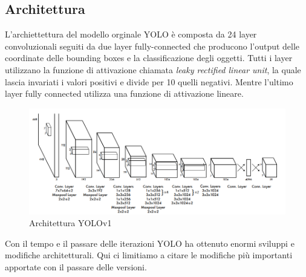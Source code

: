 \documentclass[12pt,a4paper,openright,twoside]{report}
\begin{document}
\subsection{Architettura}
L'archiettettura del modello orginale YOLO è composta da 24 layer convoluzionali seguiti da due layer fully-connected che producono l'output delle coordinate delle bounding boxes e la classificazione degli oggetti. 
Tutti i layer utilizzano la funzione di attivazione chiamata \emph{leaky rectified linear unit}, la quale lascia invariati i valori positivi e divide per 10 quelli negativi. Mentre l'ultimo layer fully connected utilizza una funzione di attivazione lineare.
\begin{figure}[h]
\centering
\includegraphics[width=\linewidth]{yolo1_arch.png}
\caption{Architettura YOLOv1}
\end{figure}
Con il tempo e il passare delle iterazioni YOLO ha ottenuto enormi sviluppi e modifiche architetturali. Qui ci limitiamo a citare le modifiche più importanti apportate con il passare delle versioni. 
\end{document}
